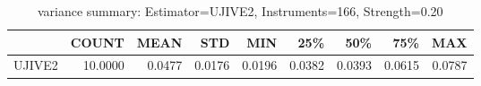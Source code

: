 \begin{table}[ht]
\centering
\caption{variance summary: Estimator=UJIVE2, Instruments=166, Strength=0.20}
\begin{tabular}{lrrrrrrrr}
\toprule
 & COUNT & MEAN & STD & MIN & 25\% & 50\% & 75\% & MAX \\
\midrule
UJIVE2 & 10.0000 & 0.0477 & 0.0176 & 0.0196 & 0.0382 & 0.0393 & 0.0615 & 0.0787 \\
\bottomrule
\end{tabular}
\end{table}
